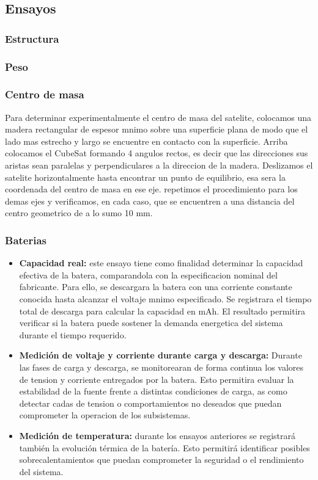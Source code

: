   \subsection{Ensayos}
    \subsubsection{Estructura}
    \subsubsection{Peso}
    \subsubsection{Centro de masa}
    Para determinar experimentalmente el centro de masa del satelite, colocamos una madera
    rectangular de espesor mnimo sobre una superficie plana de modo que el lado mas estrecho
    y largo se encuentre en contacto con la superficie. Arriba colocamos el CubeSat formando 4
    angulos rectos, es decir que las direcciones sus aristas sean paralelas y perpendiculares a la
    direccion de la madera. Deslizamos el satelite horizontalmente hasta encontrar un punto de
    equilibrio, esa sera la coordenada del centro de masa en ese eje. repetimos el procedimiento
    para los demas ejes y verificamos, en cada caso, que se encuentren a una distancia del centro
    geometrico de a lo sumo 10 mm.

    \subsubsection{Baterias}
    \begin{itemize}
      \item \textbf{Capacidad real:} este ensayo tiene como finalidad determinar la capacidad efectiva
      de la batera, comparandola con la especificacion nominal del fabricante. Para ello, se
      descargara la batera con una corriente constante conocida hasta alcanzar el voltaje
      mnimo especificado. Se registrara el tiempo total de descarga para calcular la capacidad en mAh. 
      El resultado permitira verificar si la batera puede sostener la demanda
      energetica del sistema durante el tiempo requerido.

      \item \textbf{Medición de voltaje y corriente durante carga y descarga:} Durante las fases de
      carga y descarga, se monitorearan de forma continua los valores de tension y corriente
      entregados por la batera. Esto permitira evaluar la estabilidad de la fuente frente a
      distintas condiciones de carga, as como detectar cadas de tension o comportamientos
      no deseados que puedan comprometer la operacion de los subsistemas.

      \item \textbf{Medición de temperatura:} durante los ensayos anteriores se registrará también la evolución térmica 
      de la batería. Esto permitirá identificar posibles sobrecalentamientos que puedan comprometer la seguridad o el 
      rendimiento del sistema.
    \end{itemize}

